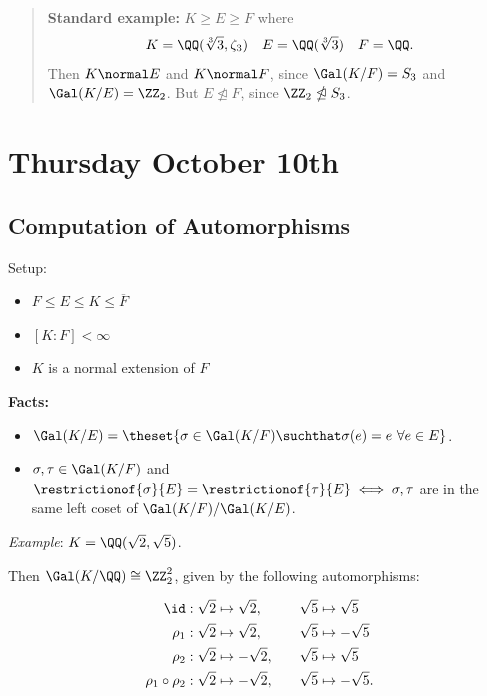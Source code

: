 \begin{quote}
\textbf{Standard example:} \(K \geq E \geq F\) where
\begin{align*}
K = \QQ(\sqrt[3] 3, \zeta_3)\quad E = \QQ(\sqrt[3] 3) \quad F = \QQ
.\end{align*} Then \(K \normal E\) and \(K\normal F\), since
\(\Gal(K/F) = S_3\) and \(\Gal(K/E) = \ZZ_2\). But
\(E \ntrianglelefteq F\), since \(\ZZ_2 \ntrianglelefteq S_3\).
\end{quote}

\hypertarget{thursday-october-10th}{%
\section{Thursday October 10th}\label{thursday-october-10th}}

\hypertarget{computation-of-automorphisms}{%
\subsection{Computation of
Automorphisms}\label{computation-of-automorphisms}}

Setup:

\begin{itemize}
\item
  \(F \leq E \leq K \leq \overline F\)
\item
  \([K: F] < \infty\)
\item
  \(K\) is a normal extension of \(F\)
\end{itemize}

\textbf{Facts:}

\begin{itemize}
\item
  \(\Gal(K/E) = \theset{\sigma \in \Gal(K/F) \suchthat \sigma(e) = e ~\forall e\in E}\).
\item
  \(\sigma, \tau \in \Gal(K/F)\) and
  \(\restrictionof{\sigma}{E} = \restrictionof{\tau}{E} \iff \sigma, \tau\)
  are in the same left coset of \(\Gal(K/F) / \Gal(K/E)\).
\end{itemize}

\emph{Example}: \(K = \QQ(\sqrt 2, \sqrt 5)\).

Then \(\Gal(K/\QQ) \cong \ZZ_2^2\), given by the following
automorphisms:

\begin{align*}
\id:     \sqrt 2 &\mapsto \sqrt 2,  \quad& \sqrt 5 &\mapsto \sqrt 5 \\
\rho_1:  \sqrt 2 &\mapsto \sqrt 2,  \quad& \sqrt 5 &\mapsto -\sqrt 5 \\
\rho_2:  \sqrt 2 &\mapsto -\sqrt 2, \quad& \sqrt 5 &\mapsto \sqrt 5 \\
\rho_1 \circ \rho_2:  \sqrt 2 &\mapsto -\sqrt 2, \quad& \sqrt 5 &\mapsto -\sqrt 5
.\end{align*}

